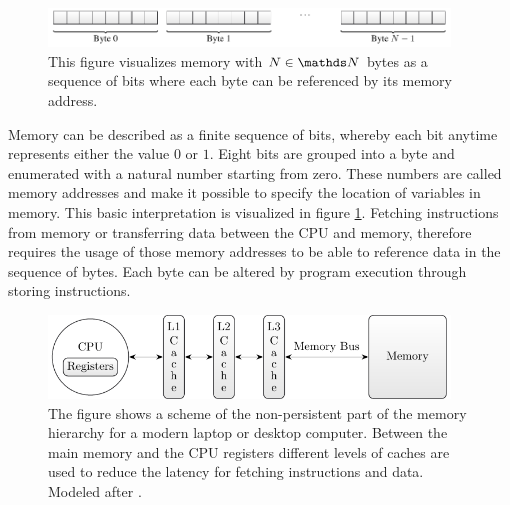 \documentclass{stdlocal}
\begin{document}
    \begin{figure}
      \center
      \includegraphics[width=0.95\textwidth]{figures/memory.pdf}
      \caption[Memory Structure]{%
        This figure visualizes memory with $N\in\setNatural$ bytes as a sequence of bits where each byte can be referenced by its memory address.%
      }
      \label{fig:memory}
    \end{figure}

    Memory can be described as a finite sequence of bits, whereby each bit anytime represents either the value $0$ or $1$.
    Eight bits are grouped into a byte and enumerated with a natural number starting from zero.
    These numbers are called memory addresses and make it possible to specify the location of variables in memory.
    This basic interpretation is visualized in figure \ref{fig:memory}.
    Fetching instructions from memory or transferring data between the CPU and memory, therefore requires the usage of those memory addresses to be able to reference data in the sequence of bytes.
    Each byte can be altered by program execution through storing instructions.
    \autocite{patterson2014}

    \begin{figure}
      \center
      \includegraphics[width=0.95\textwidth]{figures/memory_hierarchy.pdf}
      \caption[Memory Hierarchy]{%
        The figure shows a scheme of the non-persistent part of the memory hierarchy for a modern laptop or desktop computer.
        Between the main memory and the CPU registers different levels of caches are used to reduce the latency for fetching instructions and data.
        Modeled after \textcite[\pno~79]{hennessy2019}.
      }
      \label{fig:memory-hierarchy}
    \end{figure}
\end{document}
